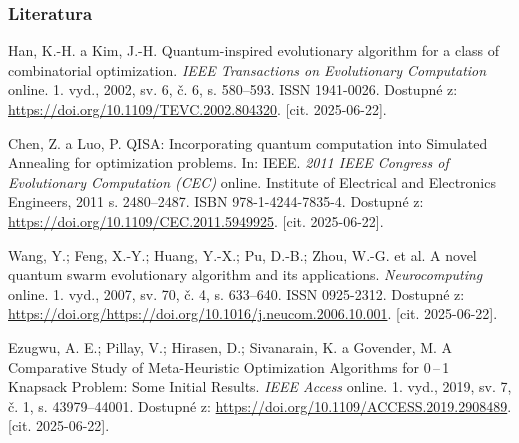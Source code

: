 \appendix{}
\begin{frame}
  \frametitle{Literatura}
    
    \scriptsize
    \begin{thebibliography}{9}
        Han, K.-H. a Kim, J.-H. 
        Quantum-inspired evolutionary algorithm for a class of combinatorial optimization. 
        \textit{IEEE Transactions on Evolutionary Computation} online. 1. vyd., 2002, sv. 6, č. 6, s. 580--593. ISSN 1941-0026. 
        Dostupné z: \url{https://doi.org/10.1109/TEVC.2002.804320}. [cit. 2025-06-22].

        Chen, Z. a Luo, P. 
        QISA: Incorporating quantum computation into Simulated Annealing for optimization problems. 
        In: IEEE. \textit{2011 IEEE Congress of Evolutionary Computation (CEC)} online. Institute of Electrical and Electronics Engineers, 2011 s. 2480--2487. ISBN 978-1-4244-7835-4. 
        Dostupné z: \url{https://doi.org/10.1109/CEC.2011.5949925}. [cit. 2025-06-22].

        Wang, Y.; Feng, X.-Y.; Huang, Y.-X.; Pu, D.-B.; Zhou, W.-G. et al. 
        A novel quantum swarm evolutionary algorithm and its applications. 
        \textit{Neurocomputing} online. 1. vyd., 2007, sv. 70, č. 4, s. 633--640. ISSN 0925-2312. 
        Dostupné z: \url{https://doi.org/https://doi.org/10.1016/j.neucom.2006.10.001}. [cit. 2025-06-22].

    
        Ezugwu, A. E.; Pillay, V.; Hirasen, D.; Sivanarain, K. a Govender, M. 
        A Comparative Study of Meta-Heuristic Optimization Algorithms for 0\,--\,1 Knapsack Problem: Some Initial Results. 
        \textit{IEEE Access} online. 1. vyd., 2019, sv. 7, č. 1, s. 43979--44001. 
        Dostupné z: \url{https://doi.org/10.1109/ACCESS.2019.2908489}. [cit. 2025-06-22].
      \end{thebibliography}      
\end{frame}
